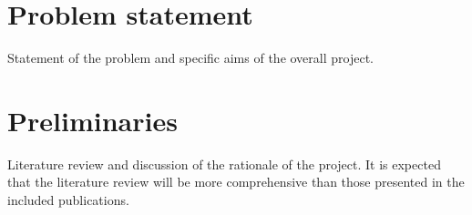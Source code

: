 \clearpage\section{Problem statement}\label{sec:intro}

Statement of the problem and specific aims of the overall project.

\clearpage\section{Preliminaries}\label{sec:pre}

Literature review and discussion of the rationale of the project.
It is expected that the literature review will be more comprehensive than
those presented in the included publications.


